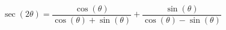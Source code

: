 {$\sec(2\theta) = \dfrac{\cos(\theta)}{\cos(\theta) + \sin(\theta)} + \dfrac{\sin(\theta)}{\cos(\theta)-\sin(\theta)}$ }
{}